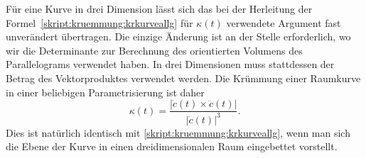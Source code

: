 Für eine Kurve in drei Dimension lässt sich das bei der Herleitung
der Formel~\eqref{skript:kruemmung:krkurveallg} für $\kappa(t)$
verwendete Argument fast unverändert übertragen.
Die einzige Änderung ist an der Stelle erforderlich, wo wir die Determinante
zur Berechnung des orientierten Volumens des Parallelograms verwendet
haben.
In drei Dimensionen muss stattdessen der Betrag des Vektorproduktes 
verwendet werden.
Die Krümmung einer Raumkurve in einer beliebigen Parametrisierung ist
daher
\begin{equation}
\kappa(t)
=
\frac{|\dot c(t)\times \ddot c(t)|}{|\dot c(t)|^3}.
\label{skript:kruemmung:krkurveallg3d}
\end{equation}
Dies ist natürlich identisch mit \eqref{skript:kruemmung:krkurveallg},
wenn man sich die Ebene der Kurve in einen dreidimensionalen Raum
eingebettet vorstellt.

